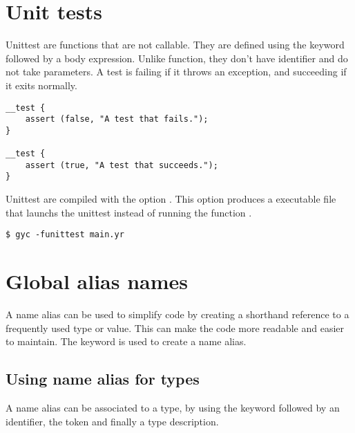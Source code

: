 

\section{Unit tests}%
\label{sec:unit_test}

Unittest are functions that are not callable. They are defined using the keyword
 followed by a body expression. Unlike function, they don't
have identifier and do not take parameters. A test is failing if it throws an
exception, and succeeding if it exits normally.

\begin{lstlisting}[style=coloredverbatim]
__test {
    assert (false, "A test that fails.");
}

__test {
    assert (true, "A test that succeeds.");
}
\end{lstlisting}


Unittest are compiled with the option . This option produces
a executable file that launchs the unittest instead of running the function
.

\begin{lstlisting}[style=intermediateVerb]
$ gyc -funittest main.yr
\end{lstlisting}

\section{Global alias names}
\label{sec:global_alias_names}


A name alias can be used to simplify code by creating a shorthand reference to a
frequently used type or value. This can make the code more readable and easier
to maintain. The keyword  is used to create a name alias.

\subsection {Using name alias for types}

A name alias can be associated to a type, by using the keyword 
followed by an identifier, the token \token{=} and finally a type description.

